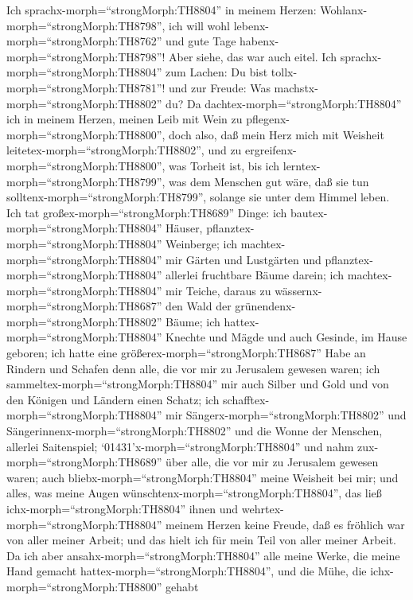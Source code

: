  Ich sprachx-morph=``strongMorph:TH8804'' in meinem Herzen:
Wohlanx-morph=``strongMorph:TH8798'', ich will wohl
lebenx-morph=``strongMorph:TH8762'' und gute Tage
habenx-morph=``strongMorph:TH8798''! Aber siehe, das war auch eitel.
 Ich sprachx-morph=``strongMorph:TH8804'' zum Lachen: Du
bist tollx-morph=``strongMorph:TH8781''! und zur Freude: Was
machstx-morph=``strongMorph:TH8802'' du?  Da
dachtex-morph=``strongMorph:TH8804'' ich in meinem Herzen, meinen Leib
mit Wein zu pflegenx-morph=``strongMorph:TH8800'', doch also, daß mein
Herz mich mit Weisheit leitetex-morph=``strongMorph:TH8802'', und zu
ergreifenx-morph=``strongMorph:TH8800'', was Torheit ist, bis ich
lerntex-morph=``strongMorph:TH8799'', was dem Menschen gut wäre, daß sie
tun solltenx-morph=``strongMorph:TH8799'', solange sie unter dem Himmel
leben.  Ich tat großex-morph=``strongMorph:TH8689'' Dinge:
ich bautex-morph=``strongMorph:TH8804'' Häuser,
pflanztex-morph=``strongMorph:TH8804'' Weinberge;  ich
machtex-morph=``strongMorph:TH8804'' mir Gärten und Lustgärten und
pflanztex-morph=``strongMorph:TH8804'' allerlei fruchtbare Bäume darein;
 ich machtex-morph=``strongMorph:TH8804'' mir Teiche, daraus
zu wässernx-morph=``strongMorph:TH8687'' den Wald der
grünendenx-morph=``strongMorph:TH8802'' Bäume;  ich
hattex-morph=``strongMorph:TH8804'' Knechte und Mägde und auch Gesinde,
im Hause geboren; ich hatte eine größerex-morph=``strongMorph:TH8687''
Habe an Rindern und Schafen denn alle, die vor mir zu Jerusalem gewesen
waren;  ich sammeltex-morph=``strongMorph:TH8804'' mir auch
Silber und Gold und von den Königen und Ländern einen Schatz; ich
schafftex-morph=``strongMorph:TH8804'' mir
Sängerx-morph=``strongMorph:TH8802'' und
Sängerinnenx-morph=``strongMorph:TH8802'' und die Wonne der Menschen,
allerlei Saitenspiel; 
`01431'\textbar x-morph=``strongMorph:TH8804'' und nahm
zux-morph=``strongMorph:TH8689'' über alle, die vor mir zu Jerusalem
gewesen waren; auch bliebx-morph=``strongMorph:TH8804'' meine Weisheit
bei mir;  und alles, was meine Augen
wünschtenx-morph=``strongMorph:TH8804'', das ließ
ichx-morph=``strongMorph:TH8804'' ihnen und
wehrtex-morph=``strongMorph:TH8804'' meinem Herzen keine Freude, daß es
fröhlich war von aller meiner Arbeit; und das hielt ich für mein Teil
von aller meiner Arbeit.  Da ich aber
ansahx-morph=``strongMorph:TH8804'' alle meine Werke, die meine Hand
gemacht hattex-morph=``strongMorph:TH8804'', und die Mühe, die
ichx-morph=``strongMorph:TH8800'' gehabt
